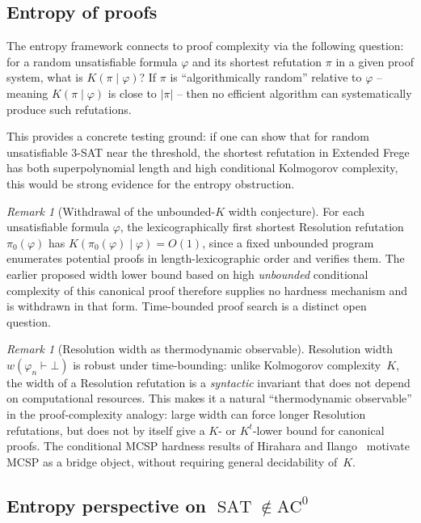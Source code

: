 \documentclass[aps,prd,twocolumn,superscriptaddress,nofootinbib]{revtex4-2}
\theoremstyle{definition}
\theoremstyle{remark}
\newtheorem{remark}[theorem]{Remark}
\DeclareMathOperator{\SAT}{SAT}
\begin{document}
\subsection{Entropy of proofs}

The entropy framework connects to proof complexity via the following question: for a random unsatisfiable formula $\varphi$ and its shortest refutation $\pi$ in a given proof system, what is $K(\pi \mid \varphi)$? If $\pi$ is ``algorithmically random'' relative to $\varphi$ -- meaning $K(\pi \mid \varphi)$ is close to $|\pi|$ -- then no efficient algorithm can systematically produce such refutations.

This provides a concrete testing ground: if one can show that for random unsatisfiable $3$-SAT near the threshold, the shortest refutation in Extended Frege has both superpolynomial length and high conditional Kolmogorov complexity, this would be strong evidence for the entropy obstruction.

\begin{remark}[Withdrawal of the unbounded-$K$ width conjecture]
\label{conj:resolution-width}
For each unsatisfiable formula $\varphi$, the lexicographically first
shortest Resolution refutation $\pi_0(\varphi)$ has
$K(\pi_0(\varphi)\mid\varphi)=O(1)$, since a fixed unbounded program
enumerates potential proofs in length-lexicographic order and verifies
them. The earlier proposed width lower bound based on high
\emph{unbounded} conditional complexity of this canonical proof
therefore supplies no hardness mechanism and is withdrawn in that form.
Time-bounded proof search is a distinct open question.
\end{remark}

\begin{remark}[Resolution width as thermodynamic observable]\label{rem:width-observable}
Resolution width $w(\varphi_n \vdash \bot)$ is robust under time-bounding: unlike Kolmogorov complexity~$K$, the width of a Resolution refutation is a \emph{syntactic} invariant that does not depend on computational resources. This makes it a natural ``thermodynamic observable'' in the proof-complexity analogy: large width can force longer Resolution refutations, but does not by itself give a $K$- or $K^t$-lower bound for canonical proofs. The conditional MCSP hardness results of Hirahara and Ilango~\cite{Ilango2025} motivate MCSP as a bridge object, without requiring general decidability of~$K$.
\end{remark}

\subsection{\texorpdfstring{Entropy perspective on $\SAT \notin \mathrm{AC}^0$}{Entropy perspective on SAT not in AC0}}
\label{sec:ac0}
\end{document}
